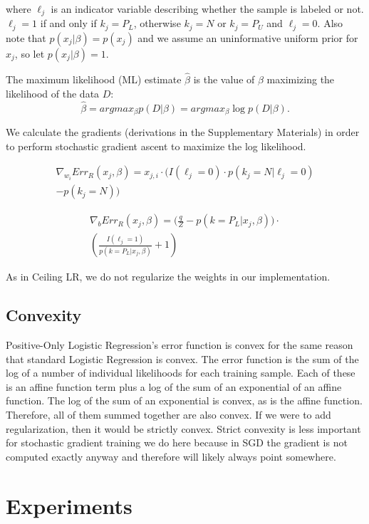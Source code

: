 \documentclass{article}
\begin{document}
where $\ell_j$ is an indicator variable describing whether the sample is labeled or not. $\ell_j = 1$ if and only if $k_j=P_L$, otherwise $k_j = N$ or $k_j=P_U$ and $\ell_j = 0$.  Also note that $p(x_j|\beta) = p(x_j)$ and we assume an uninformative uniform prior for $x_j$, so let $p(x_j|\beta) = 1$.

The maximum likelihood (ML) estimate $\hat \beta$ is the value of $\beta$ maximizing the likelihood of the data $D$:
$$
\hat \beta = arg max_{\beta} p(D | \beta) = arg max_{\beta} \log{p(D | \beta)}.
$$

We calculate the gradients (derivations in the Supplementary Materials) in order to perform stochastic gradient ascent to maximize the log likelihood.

\begin{eqnarray*}
\nabla_{w_i}{Err_R (x_j, \beta)} = x_{j,i} \cdot
    \big(	I(\ell_j=0) \cdot p(k_j=N | \ell_j=0) \\
		- p(k_j=N)
    \big)
\end{eqnarray*}

\begin{eqnarray*}
\nabla_{b}{Err_R (x_j, \beta)}  = \Big( \frac{q}{Z} - p(k=P_L | x_j,\beta) \Big) \cdot \\
	\left( 
		\frac{I(\ell_j=1)}{p(k=P_L | x_j,\beta)} + 1 
	  \right)
\end{eqnarray*}

As in Ceiling LR, we do not regularize the weights in our implementation.

\subsection{Convexity}

Positive-Only Logistic Regression's error function is convex for the same reason that standard Logistic Regression is convex. The error function is the sum of the log of a number of individual likelihoods for each training sample. Each of these is an affine function term plus a log of the sum of an exponential of an affine function. The log of the sum of an exponential is convex, as is the affine function.  Therefore, all of them summed together are also convex.  If we were to add regularization, then it would be strictly convex.  Strict convexity is less important for stochastic gradient training we do here because in SGD the gradient is not computed exactly anyway and therefore will likely always point somewhere.

\section{Experiments}
\end{document}
